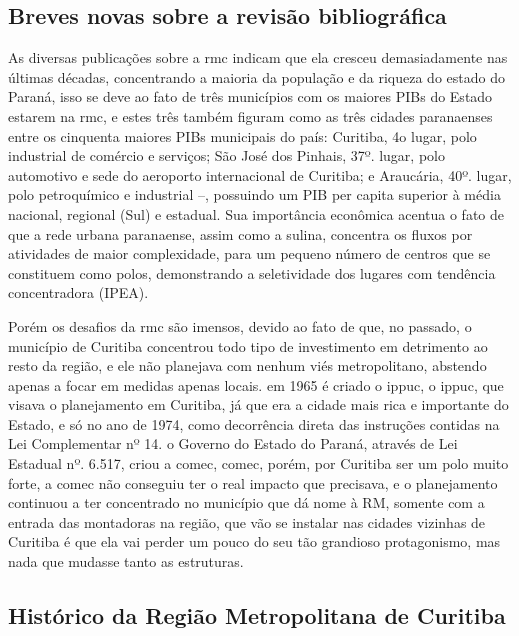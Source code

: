 	\subsection{Breves novas sobre a revisão bibliográfica}
	
	As diversas publicações sobre a \gls{rmc} indicam que ela cresceu demasiadamente nas últimas décadas, concentrando a maioria da população e da riqueza do estado do Paraná, isso se deve ao fato de três municípios com os maiores PIBs do Estado estarem na \gls{rmc}, e estes três também figuram como as três cidades paranaenses entre os cinquenta maiores PIBs municipais do país: Curitiba, 4o lugar, polo industrial de comércio e serviços; São José dos Pinhais, 37º. lugar, polo automotivo e sede do aeroporto internacional de Curitiba; e Araucária, 40º. lugar, polo petroquímico e industrial –, possuindo um PIB per capita superior à média nacional, regional (Sul) e estadual. Sua importância econômica acentua o fato de que a rede urbana paranaense, assim como a sulina, concentra os fluxos por atividades de maior complexidade, para um pequeno número de centros que se constituem como polos, demonstrando a seletividade dos lugares com tendência concentradora (IPEA).
	
	Porém os desafios da \gls{rmc} são imensos, devido ao fato de que, no passado, o município de Curitiba concentrou todo tipo de investimento em detrimento ao resto da região, e ele não planejava com nenhum viés metropolitano, abstendo apenas a focar em medidas apenas locais. em 1965 é criado o \glsdesc{ippuc}, o \gls{ippuc}, que  visava o planejamento em Curitiba, já que era a cidade mais rica e importante do Estado, e só no ano de 1974, como decorrência direta das instruções contidas na Lei Complementar nº 14. o Governo do Estado do Paraná, através de Lei Estadual nº. 6.517, criou a \glsdesc{comec}, \gls{comec}, porém, por Curitiba ser um polo muito forte, a \gls{comec} não conseguiu ter o real impacto que precisava, e o planejamento continuou a ter concentrado no município que dá nome à RM, somente com a entrada das montadoras na região, que vão se instalar nas cidades vizinhas de Curitiba é que ela vai perder um pouco do seu tão grandioso protagonismo, mas nada que mudasse tanto as estruturas. 

	\subsection{Histórico da Região Metropolitana de Curitiba}
	
